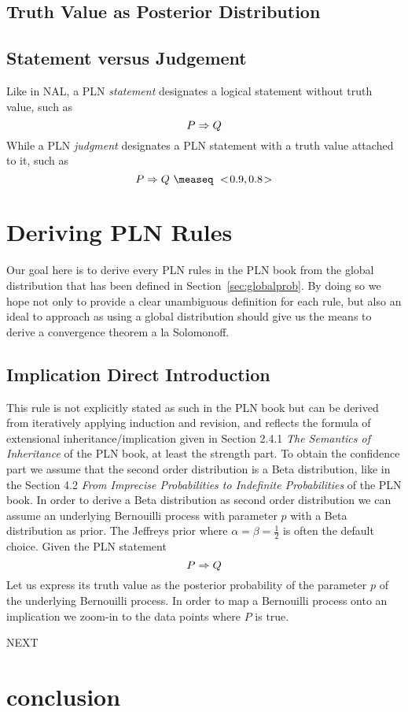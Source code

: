\documentclass[]{article}
\begin{document}
\subsection{Truth Value as Posterior Distribution}
\label{sec:truthvalue}

\subsection{Statement versus Judgement}
\label{sec:statjudge}
Like in NAL, a PLN \emph{statement} designates a logical statement
without truth value, such as
$$P \Rightarrow Q$$ While a PLN \emph{judgment} designates a PLN statement
with a truth value attached to it, such as
$$P \limp Q\ \measeq\ \STV{0.9}{0.8}$$

\section{Deriving PLN Rules}
\label{sec:derules}
Our goal here is to derive every PLN rules in the PLN book from the
global distribution that has been defined in
Section~\ref{sec:globalprob}.  By doing so we hope not only to
provide a clear unambiguous definition for each rule, but also an
ideal to approach as using a global distribution should give us the
means to derive a convergence theorem a la Solomonoff.

\subsection{Implication Direct Introduction}
This rule is not explicitly stated as such in the PLN book but can be
derived from iteratively applying induction and revision, and reflects
the formula of extensional inheritance/implication given in Section
2.4.1 \emph{The Semantics of Inheritance} of the PLN book, at least
the strength part.  To obtain the confidence part we assume that the
second order distribution is a Beta distribution, like in the Section
4.2 \emph{From Imprecise Probabilities to Indefinite Probabilities} of
the PLN book.  In order to derive a Beta distribution as second order
distribution we can assume an underlying Bernouilli process with
parameter $p$ with a Beta distribution as prior.  The Jeffreys prior
where $\alpha=\beta=\frac{1}{2}$ is often the default choice.  Given
the PLN statement
$$P \Rightarrow Q$$ Let us express its truth value as the posterior
probability of the parameter $p$ of the underlying Bernouilli process.
In order to map a Bernouilli process onto an implication we zoom-in to
the data points where $P$ is true.

NEXT

\section{conclusion}



\end{document}
